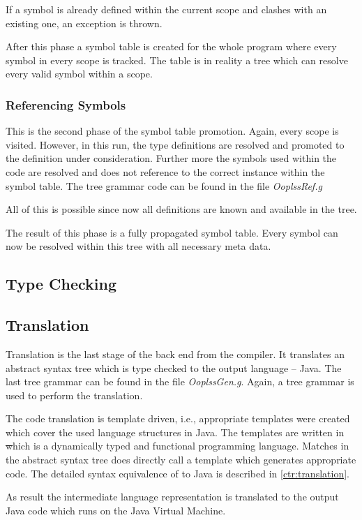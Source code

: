 If a symbol is already defined within the current scope and clashes with
an existing one, an exception is thrown.

After this phase a symbol table is created for the whole program where
every symbol in every scope is tracked. The table is in reality a tree
which can resolve every valid symbol within a scope.

\subsubsection{Referencing Symbols}
This is the second phase of the symbol table promotion. Again, every scope
is visited. However, in this run, the type definitions are resolved and
promoted to the definition under consideration. Further more the symbols
used within the code are resolved and does not reference to the correct
instance within the symbol table. The tree grammar code can be found in
the file \emph{OoplssRef.g}

All of this is possible since now all definitions are known and available
in the tree.

The result of this phase is a fully propagated symbol table. Every symbol can
now be resolved within this tree with all necessary meta data.

\subsection{Type Checking}

\subsection{Translation}
Translation is the last stage of the back end from the compiler. It
translates an abstract syntax tree which is type checked to the
output language -- Java. The last tree grammar can be found in the
file \emph{OoplssGen.g}. Again, a tree grammar is used to perform the
translation.

The code translation is template driven, i.e., appropriate templates
were created which cover the used language structures in Java. The
templates are written in \st which is a dynamically typed and functional
programming language. Matches in the abstract syntax tree does directly
call a template which generates appropriate code. The detailed syntax
equivalence of \ooplss to Java is described in \cref{ctr:translation}.

As result the intermediate language representation is translated to the
output Java code which runs on the Java Virtual Machine.

